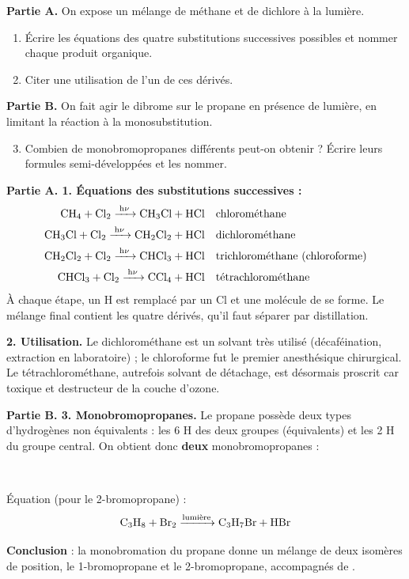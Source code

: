 \documentclass[11pt]{article}
\begin{document}
\begin{exoresolu}
\textbf{Partie A.} On expose un mélange de méthane et de dichlore à la lumière.
\begin{enumerate}
\item Écrire les équations des quatre substitutions successives possibles et nommer chaque produit organique.
\item Citer une utilisation de l'un de ces dérivés.
\end{enumerate}
\textbf{Partie B.} On fait agir le dibrome sur le propane en présence de lumière, en limitant la réaction à la monosubstitution.
\begin{enumerate}
\setcounter{enumi}{2}
\item Combien de monobromopropanes différents peut-on obtenir ? Écrire leurs formules semi-développées et les nommer.
\end{enumerate}
\tcblower
\textbf{Partie A. 1. Équations des substitutions successives :}
\begin{align*}
\ce{CH4 + Cl2 ->[h\nu] CH3Cl + HCl} & \quad \text{chlorométhane} \\
\ce{CH3Cl + Cl2 ->[h\nu] CH2Cl2 + HCl} & \quad \text{dichlorométhane} \\
\ce{CH2Cl2 + Cl2 ->[h\nu] CHCl3 + HCl} & \quad \text{trichlorométhane (chloroforme)} \\
\ce{CHCl3 + Cl2 ->[h\nu] CCl4 + HCl} & \quad \text{tétrachlorométhane}
\end{align*}
À chaque étape, un H est remplacé par un Cl et une molécule de  se forme. Le mélange final contient les quatre dérivés, qu'il faut séparer par distillation.

\textbf{2. Utilisation.} Le dichlorométhane  est un solvant très utilisé (décaféination, extraction en laboratoire) ; le chloroforme  fut le premier anesthésique chirurgical. Le tétrachlorométhane, autrefois solvant de détachage, est désormais proscrit car toxique et destructeur de la couche d'ozone.

\textbf{Partie B. 3. Monobromopropanes.} Le propane  possède deux types d'hydrogènes non équivalents : les 6 H des deux groupes  (équivalents) et les 2 H du groupe  central. On obtient donc \textbf{deux} monobromopropanes :
\begin{center}
 \qquad {} \\
\vspace{0,5em}
 \qquad {}
\end{center}
Équation (pour le 2-bromopropane) :
\[ \ce{C3H8 + Br2 ->[\text{lumière}] C3H7Br + HBr} \]

\textbf{Conclusion} : la monobromation du propane donne un mélange de deux isomères de position, le 1-bromopropane et le 2-bromopropane, accompagnés de .
\end{exoresolu}
\end{document}
